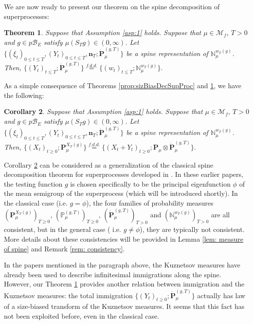 \documentclass[UTF8]{pkuthss}
\theoremstyle{plain}
\newtheorem{thm}{Theorem}[section]
\newtheorem{cor}[thm]{Corollary}
\theoremstyle{definition}
\numberwithin{equation}{section}
\begin{document}
	We are now ready to present our theorem on the spine decomposition of superprocesses:
\begin{thm}\label{prop:sizBiasNMeas}
	Suppose that Assumption \ref{asp:1} holds.
	Suppose that $\mu \in \mathcal M_f$, $T >0$ and $g \in p\mathscr B_E$ satisfy $\mu(S_Tg)\in (0,\infty)$.
	Let $\{(\xi_t)_{0\leq t\leq T}, (Y_t)_{0\leq t\leq T}, \mathbf n_T; \dot {\mathbf P}^{(g,T)}_\mu\}$ be a spine representation of $\mathbb N_\mu^{w_T(g)}$.
	Then,
$
	\{(Y_t)_{t\leq T}; \dot{\mathbf P}^{(g,T)}_\mu\}
	\overset{f.d.d.}{=} \{(w_t)_{t\leq T}; \mathbb N_\mu^{w_T(g)}\}.
$
\end{thm}
	As a simple consequence of Theorems \ref{prop:sizBiasDecSupProc} and  \ref{prop:sizBiasNMeas}, we have the following:
\begin{cor}\label{cro: spine decomposition}
	Suppose that Assumption \ref{asp:1} holds.
	Suppose that $\mu \in \mathcal M_f$, $T >0$ and $g \in p\mathscr B_E$ satisfy $\mu(S_Tg)\in (0,\infty)$.
	Let $\{(\xi_t)_{0\leq t\leq T}, (Y_t)_{0\leq t\leq T}, \mathbf n_T; \dot {\mathbf P}^{(g,T)}_\mu\}$ be a spine representation of $\mathbb N_\mu^{w_T(g)}$.
	Then,
$
	\{(X_t)_{t\geq 0}; \mathbf P_\mu^{X_T(g)}\}
	\overset{f.d.d.}{=} \{(X_t + Y_t)_{t\geq 0}; \mathbf P_\mu \otimes \dot {\mathbf P}^{(g,T)}_\mu\}.
$
\end{cor}
	
	Corollary \ref{cro: spine decomposition} can be considered as a generalization of the classical spine decomposition theorem for superprocesses developed in \cite{EckhoffKyprianouWinkel2015Spines, EnglanderKyprianou2004Local, LiuRenSong2009LlogL}.
		In these earlier papers, the testing function $g$ is chosen specifically to be  the principal eigenfunction $\phi$ of the mean semigroup of the superprocess (which will be introduced shortly).
In the classical case (i.e. $g = \phi$), the four families of probability measures
	$(\mathbf P_\mu^{X_T(g)})_{T\geq 0}$, $(\mathbb P_\mu^{(g, T)})_{T\geq 0}$, $(\dot{\mathbf P}_{\mu}^{(g,T)})_{T>0}$
		and $(\mathbb N_\mu^{w_T(g)})_{T> 0}$ are all consistent,
	but  in the general case ( i.e. $g\neq \phi$), they are typically not consistent.
	More details about these consistencies will be provided in Lemma \ref{lem: measure of spine} and Remark \ref{rem: consistency}.
	
In the papers mentioned in the paragraph above, the Kuznetsov measures have already been used to describe infinitesimal immigrations along the spine.
	However, our Theorem \ref{prop:sizBiasNMeas} provides
   another  relation between
	immigration and the Kuznetsov measures: the total immigration $\{(Y_t)_{t\geq 0}; \dot {\mathbf P}^{(g,T)}_\mu\}$ actually has law of a size-biased transform of the Kuznetsov measures.
It seems that this fact has not been exploited before, even in the classical case.
\end{document}
